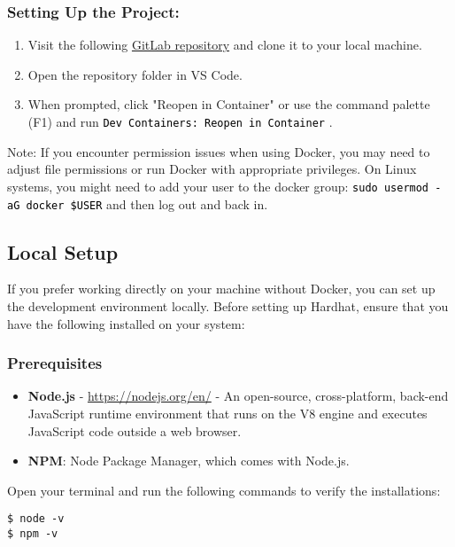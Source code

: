 \documentclass[12pt]{article}
\newcommand{\codegrey}[1]{%
  \texttt{\colorbox{black!4}{\textcolor{black}{#1}}}%
}
\begin{document}
\subsubsection*{Setting Up the Project:}

\begin{enumerate}
  \item Visit the following \href{https://gitlab.fel.cvut.cz/radovluk/smart-contracts-exercises/-/tree/main/01-Hello-Blockchain-World/task/task-code}{GitLab repository} and clone it to your local machine.
  \item Open the repository folder in VS Code.
  \item When prompted, click "Reopen in Container" or use the command palette (F1) and run \codegrey{Dev Containers: Reopen in Container}.
\end{enumerate}

\noindent
Note: If you encounter permission issues when using Docker, you may need to adjust file permissions or run Docker with appropriate privileges. On Linux systems, you might need to add your user to the docker group: \codegrey{sudo usermod -aG docker \$USER} and then log out and back in.

\subsection{Local Setup}

If you prefer working directly on your machine without Docker, you can set up the development environment locally. Before setting up Hardhat, ensure that you have the following installed on your system:

\subsubsection*{Prerequisites}
\begin{itemize}
    \item \textbf{Node.js} - \url{https://nodejs.org/en/} - An open-source, cross-platform, back-end JavaScript runtime environment that runs on the V8 engine and executes JavaScript code outside a web browser.
    \item \textbf{NPM}: Node Package Manager, which comes with Node.js.
\end{itemize}

\noindent
Open your terminal and run the following commands to verify the installations:

\begin{verbatim}
$ node -v
$ npm -v
\end{verbatim}
\end{document}
